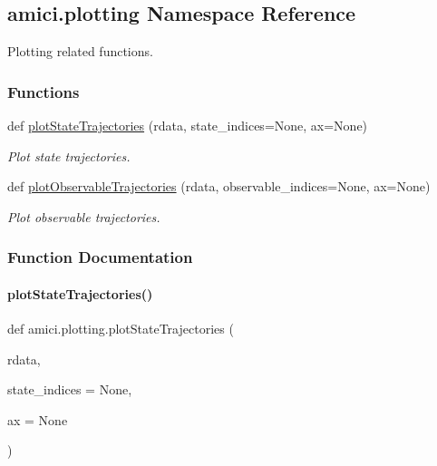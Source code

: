 \hypertarget{namespaceamici_1_1plotting}{}\subsection{amici.\+plotting Namespace Reference}
\label{namespaceamici_1_1plotting}


Plotting related functions.  


\subsubsection*{Functions}
\begin{DoxyCompactItemize}
\item 
def \mbox{\hyperlink{namespaceamici_1_1plotting_acd5cb5084b075aa388dc43b9bb3c89a6}{plot\+State\+Trajectories}} (rdata, state\+\_\+indices=None, ax=None)
\begin{DoxyCompactList}\small\item\em Plot state trajectories. \end{DoxyCompactList}\item 
def \mbox{\hyperlink{namespaceamici_1_1plotting_aad83ff2d2783fe975309f8d129ad0f3b}{plot\+Observable\+Trajectories}} (rdata, observable\+\_\+indices=None, ax=None)
\begin{DoxyCompactList}\small\item\em Plot observable trajectories. \end{DoxyCompactList}\end{DoxyCompactItemize}


\subsubsection{Function Documentation}
\mbox{\label{namespaceamici_1_1plotting_acd5cb5084b075aa388dc43b9bb3c89a6}} 
\paragraph{\texorpdfstring{plot\+State\+Trajectories()}{plotStateTrajectories()}}
{\footnotesize\ttfamily def amici.\+plotting.\+plot\+State\+Trajectories (\begin{DoxyParamCaption}\item[{}]{rdata,  }\item[{}]{state\+\_\+indices = {\ttfamily None},  }\item[{}]{ax = {\ttfamily None} }\end{DoxyParamCaption})}


